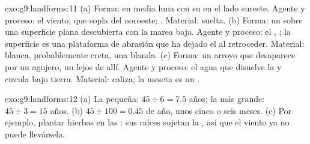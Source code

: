 \begin{solution}{exo:g9:landforms:11}
(a) Forma:  en media luna con su  en el lado
sureste. Agente y proceso: el viento, que sopla del noroeste;
. Material:  suelta. (b) Forma: un  sobre una
superficie plana descubierta con la marea baja. Agente y proceso: el ,
; la superficie es una plataforma de abrasión que ha dejado el
 al retroceder. Material:  blanca, probablemente creta, una
 blanda. (c) Forma: un arroyo que desaparece por un agujero, un
 lejos de allí. Agente y proceso: el agua que disuelve la  y
circula bajo tierra. Material: caliza; la meseta es un .
\end{solution}

\begin{solution}{exo:g9:landforms:12}
(a) La  pequeña: $45 \div 6 = 7.5$ años; la más grande: $45 \div 3 =
15$ años. (b) $45 \div 100 = 0.45$ de año, unos cinco o seis meses.
(c) Por ejemplo, plantar hierbas en las : sus raíces sujetan la
, así que el viento ya no puede llevársela.
\end{solution}

